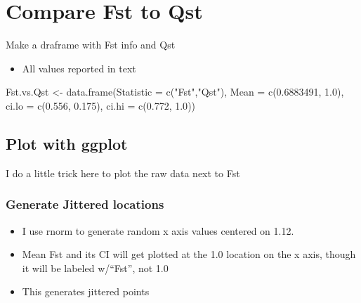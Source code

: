 \documentclass[
]{book}
\newenvironment{Shaded}{\begin{snugshade}}{\end{snugshade}}
\newcommand{\AttributeTok}[1]{\textcolor[rgb]{0.77,0.63,0.00}{#1}}
\newcommand{\FloatTok}[1]{\textcolor[rgb]{0.00,0.00,0.81}{#1}}
\newcommand{\FunctionTok}[1]{\textcolor[rgb]{0.00,0.00,0.00}{#1}}
\newcommand{\NormalTok}[1]{#1}
\newcommand{\OtherTok}[1]{\textcolor[rgb]{0.56,0.35,0.01}{#1}}
\newcommand{\StringTok}[1]{\textcolor[rgb]{0.31,0.60,0.02}{#1}}
\providecommand{\tightlist}{%
  \setlength{\itemsep}{0pt}\setlength{\parskip}{0pt}}
\begin{document}
\hypertarget{compare-fst-to-qst}{%
\chapter{Compare Fst to Qst}\label{compare-fst-to-qst}}

Make a draframe with Fst info and Qst

\begin{itemize}
\tightlist
\item
  All values reported in text
\end{itemize}

\begin{Shaded}
\begin{Highlighting}[]
\NormalTok{Fst.vs.Qst }\OtherTok{\textless{}{-}} \FunctionTok{data.frame}\NormalTok{(}\AttributeTok{Statistic =} \FunctionTok{c}\NormalTok{(}\StringTok{"Fst"}\NormalTok{,}\StringTok{"Qst"}\NormalTok{),}
                   \AttributeTok{Mean    =} \FunctionTok{c}\NormalTok{(}\FloatTok{0.6883491}\NormalTok{, }\FloatTok{1.0}\NormalTok{),}
                   \AttributeTok{ci.lo   =} \FunctionTok{c}\NormalTok{(}\FloatTok{0.556}\NormalTok{,     }\FloatTok{0.175}\NormalTok{),}
                   \AttributeTok{ci.hi   =} \FunctionTok{c}\NormalTok{(}\FloatTok{0.772}\NormalTok{,     }\FloatTok{1.0}\NormalTok{))}
\end{Highlighting}
\end{Shaded}

\hypertarget{plot-with-ggplot}{%
\section{Plot with ggplot}\label{plot-with-ggplot}}

I do a little trick here to plot the raw data next to Fst

\hypertarget{generate-jittered-locations}{%
\subsection{Generate Jittered locations}\label{generate-jittered-locations}}

\begin{itemize}
\tightlist
\item
  I use rnorm to generate random x axis values centered on 1.12.
\item
  Mean Fst and its CI will get plotted at the 1.0 location on the x axis, though it will be labeled w/``Fst'', not 1.0
\item
  This generates jittered points
\end{itemize}
\end{document}
